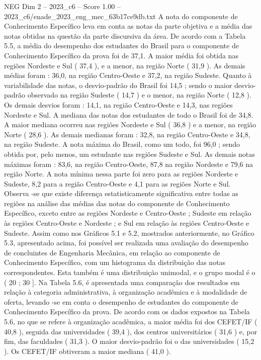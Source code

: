 \begin{textsample}{NEG Dim 2 – 2023\_c6 – Score 1.00 – 2023\_c6/enade\_2023\_eng\_mec\_63b17ce9db.txt}
A nota do componente de Conhecimento Específico leva em conta as notas da parte objetiva e a média das notas obtidas na questão da parte discursiva da área.
De acordo com a Tabela 5.5, a média do desempenho dos estudantes do Brasil para o componente de Conhecimento Específico da prova foi de 37,1.
A maior média foi obtida nas regiões Nordeste e Sul ( 37,4 ), e a menor, na região Norte ( 31,9 ).
As demais médias foram : 36,0, na região Centro-Oeste e 37,2, na região Sudeste.
Quanto à variabilidade das notas, o desvio-padrão do Brasil foi 14,5 ; sendo o maior desvio-padrão observado na região Sudeste ( 14,7 ) e o menor, na região Norte ( 12,8 ).
Os demais desvios foram : 14,1, na região Centro-Oeste e 14,3, nas regiões Nordeste e Sul.
A mediana das notas dos estudantes de todo o Brasil foi de 34,8.
A maior mediana ocorreu nas regiões Nordeste e Sul ( 36,8 ) e a menor, na região Norte ( 28,6 ).
As demais medianas foram : 32,8, na região Centro-Oeste e 34,8, na região Sudeste.
A nota máxima do Brasil, como um todo, foi 96,0 ; sendo obtida por, pelo menos, um estudante nas regiões Sudeste e Sul.
As demais notas máximas foram : 83,6, na região Centro-Oeste, 87,8 na região Nordeste e 79,6 na região Norte.
A nota mínima nessa parte foi zero para as regiões Nordeste e Sudeste, 8,2 para a região Centro-Oeste e 4,1 para as regiões Norte e Sul.
Observa -se que existe diferença estatisticamente significativa entre todas as regiões na análise das médias das notas do componente de Conhecimento Específico, exceto entre as regiões Nordeste e Centro-Oeste ; Sudeste em relação às regiões Centro-Oeste e Nordeste ; e Sul em relação às regiões Centro-Oeste e Sudeste.
Assim como nos Gráficos 5.1 e 5.2, mostrados anteriormente, no Gráfico 5.3, apresentado acima, foi possível ser realizada uma avaliação do desempenho de concluintes de Engenharia Mecânica, em relação ao componente de Conhecimento Específico, com um histograma da distribuição das notas correspondentes.
Esta também é uma distribuição unimodal, e o grupo modal é o ( 20 ; 30 ].
Na Tabela 5.6, é apresentada uma comparação dos resultados em relação à categoria administrativa, à organização acadêmica e à modalidade de oferta, levando -se em conta o desempenho de estudantes do componente de Conhecimento Específico da prova.
De acordo com os dados expostos na Tabela 5.6, no que se refere à organização acadêmica, a maior média foi dos CEFET/IF ( 40,8 ), seguida das universidades ( 39,4 ), dos centros universitários ( 31,6 ) e, por fim, das faculdades ( 31,3 ).
O maior desvio-padrão foi o das universidades ( 15,2 ).
Os CEFET/IF obtiveram a maior mediana ( 41,0 ).

\end{textsample}
